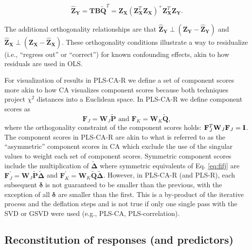 \documentclass[12pt]{article}
\begin{document}
\begin{equation}
\widehat{{\mathbf Z}}_{\mathbf Y} = {\mathbf T} {\mathbf B}\widetilde{\mathbf Q}^{T} = {\mathbf Z}_{\mathbf X} ({\mathbf Z}_{\mathbf X}^{T}{\mathbf Z}_{\mathbf X})^{+} {\mathbf Z}_{\mathbf X}^T {\mathbf Z}_{\mathbf Y}.
\label{ols_equivalence}
\end{equation}

The additional orthogonality relationships are that
\(\widehat{{\mathbf Z}}_{\mathbf Y} \perp ({\mathbf Z}_{\mathbf Y} - \widehat{{\mathbf Z}}_{\mathbf Y})\)
and
\(\widehat{{\mathbf Z}}_{\mathbf X} \perp ({\mathbf Z}_{\mathbf X} - \widehat{{\mathbf Z}}_{\mathbf X})\).
These orthogonality conditions illustrate a way to residualize (i.e.,
``regress out'' or ``correct'') for known confounding effects, akin to
how residuals are used in OLS.

For visualization of results in PLS-CA-R we define a set of component
scores more akin to how CA visualizes component scores because both
techniques project \(\chi^2\) distances into a Euclidean space. In
PLS-CA-R we define component scores as \begin{equation}
{\mathbf F}_{J} = {\mathbf W}_{J}\widetilde{\mathbf P} \textrm{ and } {\mathbf F}_{K} = {\mathbf W}_{K}\widetilde{\mathbf Q},
\label{eq:fifj}
\end{equation} where the orthogonality constraint of the component
scores holds:
\({\mathbf F}_{J}^{T}{\mathbf W}_{J}{\mathbf F}_{J} = {\bf I}\). The
component scores in PLS-CA-R are akin to what is referred to as the
``asymmetric'' component scores in CA which exclude the use of the
singular values to weight each set of component scores. Symmetric
component scores include the multiplication of
\(\widetilde{\boldsymbol \Delta}\) where symmetric equivalents of Eq.
\ref{eq:fifj} are
\({\mathbf F}^{'}_{J} = {\mathbf W}_{J}\widetilde{\mathbf P}\widetilde{\boldsymbol \Delta}\)
and
\({\mathbf F}^{'}_{K} = {\mathbf W}_{K}\widetilde{\mathbf Q}\widetilde{\boldsymbol \Delta}\).
However, in PLS-CA-R (and PLS-R), each subsequent \(\boldsymbol \delta\)
is not guaranteed to be smaller than the previous, with the exception of
all \(\boldsymbol \delta\) are smaller than the first. This is a
by-product of the iterative process and the deflation steps and is not
true if only one single pass with the SVD or GSVD were used (e.g.,
PLS-CA, PLS-correlation).

\hypertarget{reconstitution-of-responses-and-predictors}{%
\subsection{Reconstitution of responses (and
predictors)}\label{reconstitution-of-responses-and-predictors}}
\end{document}
